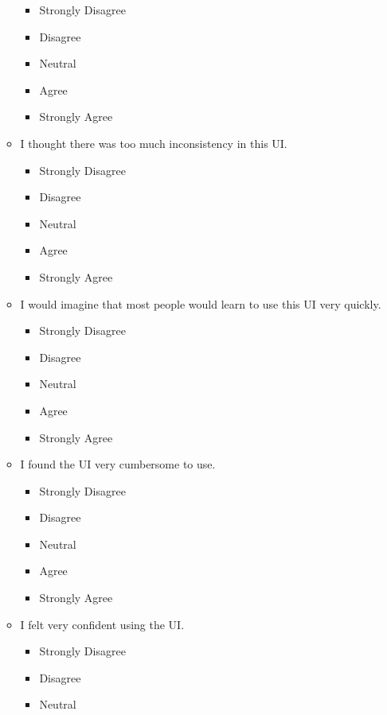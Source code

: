 \documentclass[doublespace,draft,nopageskip]{VTthesis} %
\begin{document}
\begin{itemize}
\begin{itemize}
\begin{itemize}
                \item Strongly Disagree
                \item Disagree
                \item Neutral
                \item Agree
                \item Strongly Agree
            \end{itemize}
        \item I thought there was too much inconsistency in this UI.
            \begin{itemize}
                \item Strongly Disagree
                \item Disagree
                \item Neutral
                \item Agree
                \item Strongly Agree
            \end{itemize}
        \item I would imagine that most people would learn to use this UI very quickly.
            \begin{itemize}
                \item Strongly Disagree
                \item Disagree
                \item Neutral
                \item Agree
                \item Strongly Agree
            \end{itemize}
        \item I found the UI very cumbersome to use.
            \begin{itemize}
                \item Strongly Disagree
                \item Disagree
                \item Neutral
                \item Agree
                \item Strongly Agree
            \end{itemize}
	\item I felt very confident using the UI.
            \begin{itemize}
                \item Strongly Disagree
                \item Disagree
                \item Neutral

\end{itemize}
\end{itemize}
\end{itemize}
\end{document}
